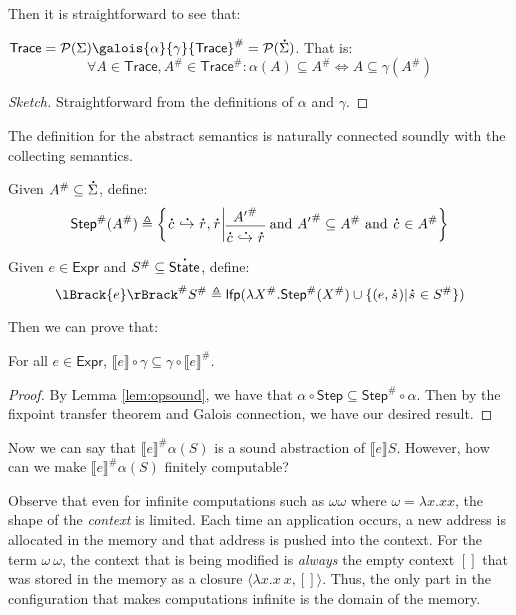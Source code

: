 \documentclass[acmsmall,screen,review]{acmart}\settopmatter{printfolios=true,printccs=false,printacmref=false}
\theoremstyle{acmdefinition}
\newcommand*{\pset}{\mathcal{P}}
\newcommand*{\A}[1]{\overset{\,_{\mbox{\Large .}}}{#1}}
\newcommand*{\Abs}[1]{{#1}^{\#}}
\newcommand*{\Expr}{\mathsf{Expr}}
\newcommand*{\Trace}{\mathsf{Trace}}
\newcommand*{\config}{c}
\newcommand*{\rightst}{r}
\newcommand*{\State}{\mathsf{State}}
\newcommand*{\lfp}{\mathsf{lfp}}
\newcommand*{\Step}{\mathsf{Step}}
\newcommand*{\semarrow}{\hookrightarrow}
\newcommand*{\sembracket}[1]{\lBrack{#1}\rBrack}
\begin{document}
Then it is straightforward to see that:
\begin{lemma}
  $\Trace=\pset(\Sigma)\galois{\alpha}{\gamma}\Abs{\Trace}=\pset(\A\Sigma)$. That is:
  \[\forall A\in \Trace,\Abs{A}\in\Abs{\Trace}:\alpha(A)\subseteq\Abs{A}\Leftrightarrow A\subseteq\gamma(\Abs{A})\]
\end{lemma}
\begin{proof}[Sketch]
  Straightforward from the definitions of $\alpha$ and $\gamma$.
\end{proof}

The definition for the abstract semantics is naturally connected soundly with the collecting semantics.
\begin{definition}
  Given $\Abs{A}\subseteq\A{\Sigma}$, define:
  \[
    \Abs{\mathsf{Step}}(\Abs{A})\triangleq
    \left\{\A\config\A\semarrow\A\rightst, \A\rightst\middle|
    \begin{prooftree}[center=true]
      \hypo{\Abs{A'}}\infer1{\A\config\A\semarrow\A\rightst}
    \end{prooftree}\text{ and }
    \Abs{A'}\subseteq \Abs{A}\text{ and }\A\config\in\Abs{A}
    \right\}
  \]
\end{definition}
\begin{definition}
  Given $e\in\Expr$ and $\Abs{S}\subseteq\A\State$, define:
  \[
    \Abs{\sembracket{e}}\Abs{S}\triangleq\lfp(\lambda \Abs{X}.\Abs{\mathsf{Step}}(\Abs{X})\cup\{(e,\A{s})|\A{s}\in \Abs{S}\})
  \]
\end{definition}
Then we can prove that:
\begin{theorem}[Soundness]
  For all $e\in\Expr$, $\sembracket{e}\circ\gamma\subseteq\gamma\circ\Abs{\sembracket{e}}$.
\end{theorem}
\begin{proof}
  By Lemma \ref{lem:opsound}, we have that $\alpha\circ\Step\subseteq\Abs\Step\circ\alpha$.
  Then by the fixpoint transfer theorem and Galois connection, we have our desired result.
\end{proof}

Now we can say that $\Abs{\sembracket{e}}\alpha(S)$ is a sound abstraction of $\sembracket{e}S$.
However, how can we make $\Abs{\sembracket{e}}\alpha(S)$ finitely computable?

Observe that even for infinite computations such as $\omega\omega$ where $\omega=\lambda x.xx$,
the shape of the \emph{context} is limited.
Each time an application occurs, a new address is allocated in the memory and that address is pushed into the context.
For the term $\omega\:\omega$, the context that is being modified is \emph{always} the empty context $[]$ that was stored in the memory as a closure $\langle\lambda x.x\:x,[]\rangle$.
Thus, the only part in the configuration that makes computations infinite is the domain of the memory.
\end{document}
